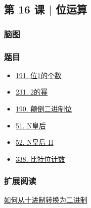 \subsection{第 16 课 | 位运算}

\subsubsection{脑图}

\subsubsection{题目}

\begin{itemize}
  \item \hyperref[leetcode:191]{191. 位1的个数}
  \item \hyperref[leetcode:231]{231. 2的幂}
  \item \hyperref[leetcode:190]{190. 颠倒二进制位}
  \item \hyperref[leetcode:51]{51. N皇后}
  \item \hyperref[leetcode:52]{52. N皇后 II}
  \item \hyperref[leetcode:338]{338. 比特位计数}
\end{itemize}

\subsubsection{扩展阅读}

\href{https://zh.wikihow.com/%E4%BB%8E%E5%8D%81%E8%BF%9B%E5%88%B6%E8%BD%AC%E6%8D%A2%E4%B8%BA%E4%BA%8C%E8%BF%9B%E5%88%B6}{如何从十进制转换为二进制}
